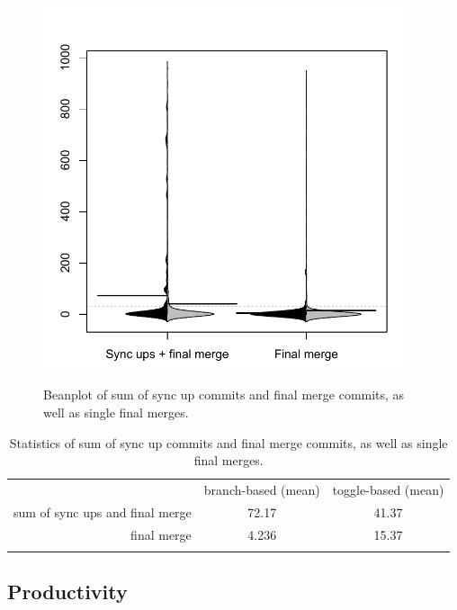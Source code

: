 \begin{figure}
	\includegraphics[width=0.95\textwidth]{figure/sum_merge_commit_by_branch_orca_filtered_filtered.pdf}
	\label{fig:syncupMergeSum}
	\caption{Beanplot of sum of sync up commits and final merge commits, as well as single final merges.}
\end{figure}

\begin{table}
	\label{tab:syncupMergeSum}
	\caption{Statistics of sum of sync up commits and final merge commits, as well as single final merges.}
	\begin{tabular}{r|c|c}
	\hline\noalign{\smallskip}
		& branch-based (mean) & toggle-based (mean) \\
	\noalign{\smallskip}\hline\noalign{\smallskip}
	sum of sync ups and final merge & 72.17 & 41.37 \\
	final merge & 4.236 & 15.37 \\
	\noalign{\smallskip}\hline
	\end{tabular}
\end{table}



\subsection{Productivity}

